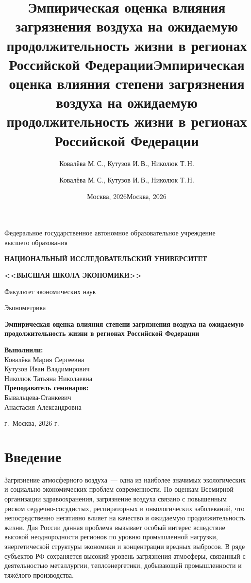 \documentclass[11pt,a4paper]{article}
\title{Эмпирическая оценка влияния загрязнения воздуха на ожидаемую продолжительность жизни в регионах Российской Федерации}
\author{Ковалёва М.\,С., Кутузов И.\,В., Николюк Т.\,Н.}
\date{Москва, 2026}
\title{Эмпирическая оценка влияния степени загрязнения воздуха на ожидаемую продолжительность жизни в регионах Российской Федерации}
\author{Ковалёва М.\,С., Кутузов И.\,В., Николюк Т.\,Н.}
\date{Москва, 2026}
\begin{document}
\begin{titlepage}
\centering
\vspace*{1cm}
{\large Федеральное государственное автономное образовательное учреждение\\
высшего образования\par}
\vspace{0.5cm}
{\Large \textbf{НАЦИОНАЛЬНЫЙ ИССЛЕДОВАТЕЛЬСКИЙ УНИВЕРСИТЕТ}\par}
\vspace{0.3cm}
{\Large \textbf{<<ВЫСШАЯ ШКОЛА ЭКОНОМИКИ>>}\par}
\vspace{0.5cm}
{\large Факультет экономических наук\par}
\vspace{0.3cm}
{\large Эконометрика\par}

\vfill

{\Large\bfseries Эмпирическая оценка влияния степени загрязнения воздуха на ожидаемую продолжительность жизни в регионах Российской Федерации\par}

\vfill

\begin{flushright}
\begin{minipage}{0.6\textwidth}
\raggedleft
\textbf{Выполнили:}\\[0.3em]
Ковалёва Мария Сергеевна\\
Кутузов Иван Владимирович\\
Николюк Татьяна Николаевна\\[1em]
\textbf{Преподаватель семинаров:}\\[0.3em]
Бывальцева-Станкевич\\
Анастасия Александровна
\end{minipage}
\end{flushright}

\vfill
{\large г.~Москва, 2026 г.\par}
\end{titlepage}

\section*{Введение}

Загрязнение атмосферного воздуха~--- одна из наиболее значимых экологических и социально-экономических проблем современности. По оценкам Всемирной организации здравоохранения, загрязнение воздуха связано с повышенным риском сердечно-сосудистых, респираторных и онкологических заболеваний, что непосредственно негативно влияет на качество и ожидаемую продолжительность жизни. Для России данная проблема вызывает особый интерес вследствие высокой неоднородности регионов по уровню промышленной нагрузки, энергетической структуры экономики и концентрации вредных выбросов. В ряде субъектов РФ сохраняется высокий уровень загрязнения атмосферы, связанный с деятельностью металлургии, теплоэнергетики, добывающей промышленности и тяжёлого производства.
\end{document}

